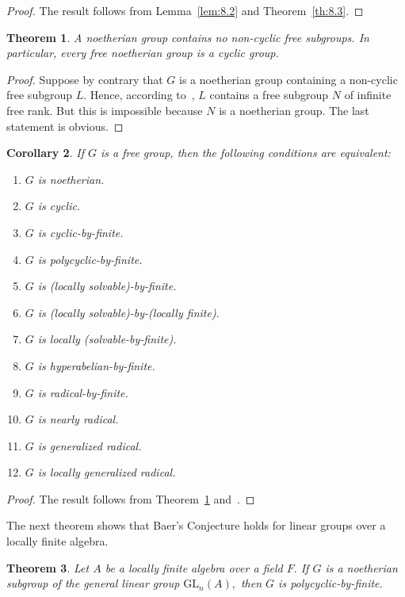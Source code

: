 \documentclass{amsart}
\newtheorem{theorem}{Theorem}[section]
\newtheorem{corollary}[theorem]{Corollary}
\theoremstyle{definition}
\begin{document}
\begin{proof} The result follows from Lemma~\ref{lem:8.2} and Theorem~\ref{th:8.3}.
\end{proof}
\begin{theorem}\label{th:8.5} A noetherian group contains no non-cyclic free subgroups. In particular, every free noetherian group is a cyclic group. 
\end{theorem}
\begin{proof} Suppose by contrary that $G$ is a noetherian group containing a non-cyclic free subgroup $L$. Hence, according to~\cite[Proposition 3.1]{Bo_LyPa_2001}, $L$ contains a free subgroup $N$ of infinite free rank. But this is impossible because $N$ is a noetherian group. The last statement is obvious.
\end{proof}
\begin{corollary}\label{cor:8.6} If $G$ is a free group, then the following conditions are equivalent:
	\begin{enumerate}
		\rm\item\textit{$G$ is noetherian.}
		\rm\item\textit{$G$ is cyclic.}
		\rm\item\textit{$G$ is cyclic-by-finite.}
		\rm\item\textit{$G$ is polycyclic-by-finite.}
		\rm\item\textit{$G$ is (locally solvable)-by-finite.}
		\rm\item\textit{$G$ is (locally solvable)-by-(locally finite).}
		\rm\item\textit{$G$ is locally (solvable-by-finite).}
		\rm\item\textit{$G$ is hyperabelian-by-finite.}
		\rm\item\textit{$G$ is radical-by-finite.}
		\rm\item\textit{$G$ is nearly radical.}
		\rm\item\textit{$G$ is generalized radical.}
		\rm\item\textit{$G$ is locally generalized radical.}
	\end{enumerate}
\end{corollary}
\begin{proof} The result follows from Theorem~\ref{th:8.5} and~\cite[Theorem 2.4]{Pa_ChuaHai_2026}.
\end{proof}
The next theorem shows that Baer's Conjecture holds for linear groups over a locally finite algebra.
\begin{theorem}\label{th:8.7} Let $A$ be a locally finite algebra over a field $F.$ If $G$ is a noetherian subgroup of the general linear group $\mathrm{GL}_n(A),$ then $G$ is polycyclic-by-finite.
\end{theorem}
\end{document}
